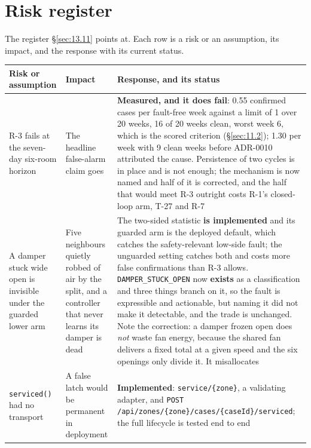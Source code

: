 \section{Risk register}\label{sec:J}

The register \S\ref{sec:13.11} points at. Each row is a risk or an assumption, its impact, and the response
with its current status.

\begin{longtable}[]{@{}
  >{\raggedright\arraybackslash}p{}
  >{\raggedright\arraybackslash}p{}
  >{\raggedright\arraybackslash}p{}@{}}
\toprule
\textbf{Risk or assumption} & \textbf{Impact} & \textbf{Response, and its status} \\
\midrule
\endhead
R-3 fails at the seven-day six-room horizon & The headline false-alarm claim goes &
\textbf{Measured, and it does fail}: 0.55 confirmed cases per fault-free week against a limit of 1
over 20 weeks, 16 of 20 weeks clean, worst week 6, which is the scored criterion (§\ref{sec:11.2}); 1.30 per
week with 9 clean weeks before ADR-0010 attributed the cause. Persistence of two cycles is in place
and is not enough; the mechanism is now named and half of it is corrected, and the half that would
meet R-3 outright costs R-1's closed-loop arm, T-27 and R-7 \\
A damper stuck wide open is invisible under the guarded lower arm & Five neighbours quietly robbed
of air by the split, and a controller that never learns its damper is dead & The two-sided statistic
\textbf{is implemented} and its guarded arm is the deployed default, which catches the
safety-relevant low-side fault; the unguarded setting catches both and costs more false confirmations
than R-3 allows. \texttt{DAMPER\_STUCK\_OPEN} now \textbf{exists} as a classification and three
things branch on it, so the fault is expressible and actionable, but naming it did not make it
detectable, and the trade is unchanged. Note the correction: a damper frozen open does \emph{not}
waste fan energy, because the shared fan delivers a fixed total at a given speed and the six openings
only divide it. It misallocates \\
\texttt{serviced()} had no transport & A false latch would be permanent in deployment &
\textbf{Implemented}: \texttt{service/\{zone\}}, a validating adapter, and
\texttt{POST /api/zones/\{zone\}/cases/\{caseId\}/serviced}; the full lifecycle is tested end to end \\

\end{longtable}
